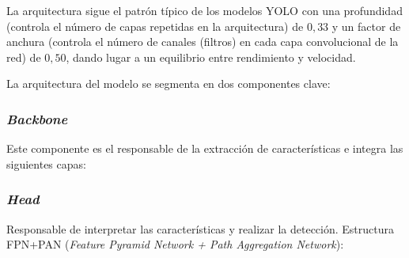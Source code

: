 \documentclass[12pt,a4paper,onecolumn,oneside]{report}
\begin{document}
La arquitectura sigue el patrón típico de los modelos YOLO con una profundidad (controla el número de capas repetidas en la arquitectura) de $0,33$ y un factor de anchura 
(controla el número de canales (filtros) en cada capa convolucional de la red) de $0,50$, dando lugar a un equilibrio entre rendimiento y velocidad.

La arquitectura del modelo se segmenta en dos componentes clave:

\subsubsection{\textit{Backbone}}

Este componente es el responsable de la extracción de características e integra las siguientes capas:

\begin{table}[H]
\caption{Estructura del \textit{backbone} del modelo personalizado}
\centering
{}
\end{table}

\subsubsection{\textit{Head}}
Responsable de interpretar las características y realizar la detección. Estructura FPN+PAN (\textit{Feature Pyramid Network + Path Aggregation Network}):
\end{document}
